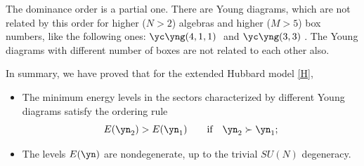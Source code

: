 The dominance order is a partial one. There are Young diagrams, which are
not related by this order for higher ($N>2$) algebras and higher ($M>5$) box numbers,
like the following ones:
{\tiny $\yc \yng(4,1,1)\;$} and {\tiny $\yc \yng(3,3)\;$}.
The  Young diagrams with dif\/ferent number of boxes are not related to each other also.


In summary, we have proved that for the extended Hubbard model \eqref{H},
\begin{itemize}\itemsep=0pt
\item
The minimum energy levels in the sectors characterized by dif\/ferent
Young diagrams satisfy the ordering rule
\begin{equation}
\label{lm}
E(\yn_2)>E(\yn_1)\qquad \text{if} \quad \yn_2\succ \yn_1;
\end{equation}
\item
The levels $E(\yn)$ are nondegenerate, up to the trivial $SU(N)$ degeneracy.
\end{itemize}
